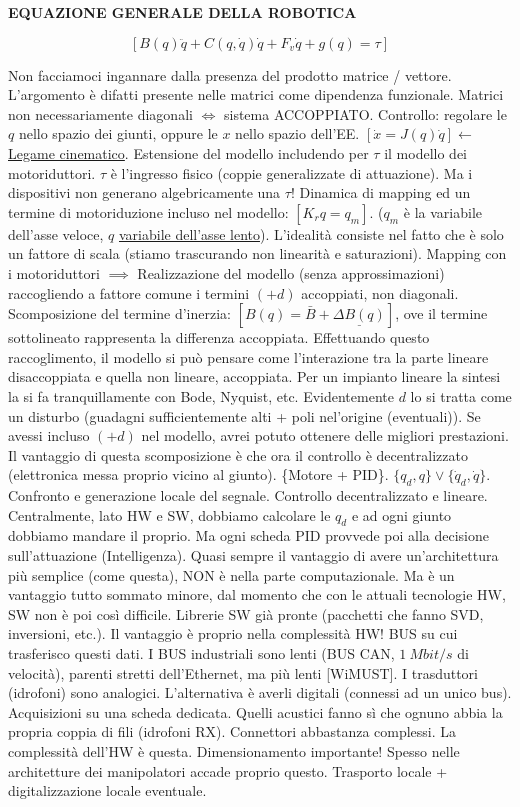 \begin{defn}{\textbf{EQUAZIONE GENERALE DELLA ROBOTICA}}

\[
	[B(q)\ddot{q} + C(q,\dot{q})\dot{q} + F_v\dot{q} + g(q) = \tau]
\]

\end{defn}

Non facciamoci ingannare dalla presenza del prodotto matrice / vettore. L'argomento è difatti presente nelle matrici come dipendenza funzionale. Matrici non necessariamente diagonali $\iff$ sistema ACCOPPIATO. Controllo: regolare le $q$ nello spazio dei giunti, oppure le $x$ nello spazio dell'EE. $[\dot{x}=J(q)\dot{q}]\leftarrow$ \underline{Legame cinematico}. Estensione del modello includendo per $\tau$ il modello dei motoriduttori. $\tau$ è l'ingresso fisico (coppie generalizzate di attuazione). Ma i dispositivi non generano algebricamente una $\tau$! Dinamica di mapping ed un termine di motoriduzione incluso nel modello: $[K_rq=q_m]$. ($q_m$ è la variabile dell'asse veloce, $q$ \underline{variabile dell'asse lento}). L'idealità consiste nel fatto che è solo un fattore di scala (stiamo trascurando non linearità e saturazioni). Mapping con i motoriduttori $\implies$ Realizzazione del modello (senza approssimazioni) raccogliendo a fattore comune i termini $(+d)$ accoppiati, non diagonali. Scomposizione del termine d'inerzia: $[B(q)=\bar{B}+\underline{\Delta B(q)}]$, ove il termine sottolineato rappresenta la differenza accoppiata. Effettuando questo raccoglimento, il modello si può pensare come l'interazione tra la parte lineare disaccoppiata e quella non lineare, accoppiata. Per un impianto lineare la sintesi la si fa tranquillamente con Bode, Nyquist, etc. Evidentemente $d$ lo si tratta come un disturbo (guadagni sufficientemente alti + poli nel'origine (eventuali)). Se avessi incluso $(+d)$ nel modello, avrei potuto ottenere delle migliori prestazioni. Il vantaggio di questa scomposizione è che ora il controllo è decentralizzato (elettronica messa proprio vicino al giunto). \{Motore + PID\}. $\{q_d,q\}\lor\{\dot{q}_d,\dot{q}\}$. Confronto e generazione locale del segnale. Controllo decentralizzato e lineare. Centralmente, lato HW e SW, dobbiamo calcolare le $q_d$ e ad ogni giunto dobbiamo mandare il proprio. Ma ogni scheda PID provvede poi alla decisione sull'attuazione (Intelligenza). Quasi sempre il vantaggio di avere un'architettura più semplice (come questa), NON è nella parte computazionale. Ma è un vantaggio tutto sommato minore, dal momento che con le attuali tecnologie HW, SW non è poi così difficile. Librerie SW già pronte (pacchetti che fanno SVD, inversioni, etc.). Il vantaggio è proprio nella complessità HW! BUS su cui trasferisco questi dati. I BUS industriali sono lenti (BUS CAN, $1\ Mbit/s$ di velocità), parenti stretti dell'Ethernet, ma più lenti [WiMUST]. I trasduttori (idrofoni) sono analogici. L'alternativa è averli digitali (connessi ad un unico bus). Acquisizioni su una scheda dedicata. Quelli acustici fanno sì che ognuno abbia la propria coppia di fili (idrofoni RX). Connettori abbastanza complessi. La complessità dell'HW è questa. Dimensionamento importante! Spesso nelle architetture dei manipolatori accade proprio questo. Trasporto locale + digitalizzazione locale eventuale.

